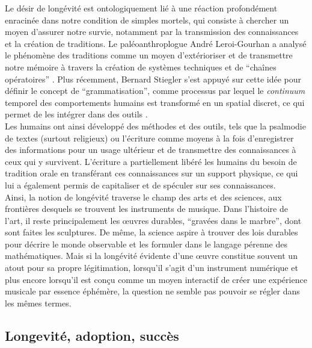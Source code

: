 \indent Le désir de longévité est ontologiquement lié à une réaction profondément enracinée dans notre condition de simples mortels, qui consiste à chercher un moyen d'assurer notre survie, notamment par la transmission des connaissances et la création de traditions. Le paléoanthroplogue André Leroi-Gourhan a analysé le phénomène des traditions comme un moyen d'extérioriser et de transmettre notre mémoire à travers la création de systèmes techniques et de ``chaînes opératoires'' \cite{leroi-gourhan_geste_1964}. Plus récemment, Bernard Stiegler s'est appuyé sur cette idée pour définir le concept de ``grammatisation'', comme processus par lequel le \textit{continuum} temporel des comportements humains est transformé en un spatial discret, ce qui permet de les intégrer dans des outils \cite{stiegler_for_2010}.\\
\indent Les humains ont ainsi développé des méthodes et des outils, tels que la psalmodie de textes (surtout religieux) ou l'écriture comme moyens à la fois d'enregistrer des informations pour un usage ultérieur et de transmettre des connaissances à ceux qui y survivent. L'écriture a partiellement libéré les humains du besoin de tradition orale en transférant ces connaissances sur un support physique, ce qui lui a également permis de capitaliser et de spéculer sur ses connaissances.\\
\indent Ainsi, la notion de longévité traverse le champ des arts et des sciences, aux frontières desquels se trouvent les instruments de musique. Dans l'histoire de l'art, il reste principalement les œuvres durables, ``gravées dans le marbre'', dont sont faites les sculptures. De même, la science aspire à trouver des lois durables pour décrire le monde observable et les formuler dans le langage pérenne des mathématiques. Mais si la longévité évidente d'une œuvre constitue souvent un atout pour sa propre légitimation, lorsqu'il s'agit d'un instrument numérique et plus encore lorsqu'il est conçu comme un moyen interactif de créer une expérience musicale par essence éphémère, la question ne semble pas pouvoir se régler dans les mêmes termes.\\

	
\subsection{Longevité, adoption, succès}

